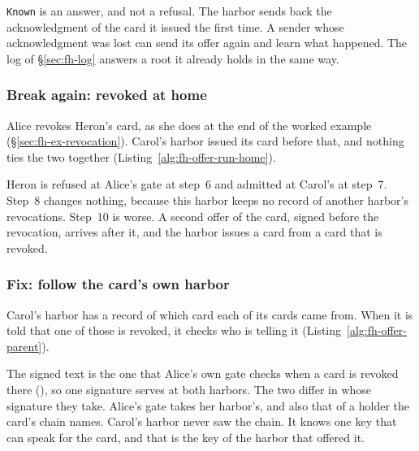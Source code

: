 
\texttt{Known} is an answer, and not a refusal. The harbor sends back the
acknowledgment of the card it issued the first time. A sender whose
acknowledgment was lost can send its offer again and learn what happened.
The log of \S\ref{sec:fh-log} answers a root it already holds in the same
way.

\subsubsection{Break again: revoked at home}

Alice revokes Heron's card, as she does at the end of the worked example
(\S\ref{sec:fh-ex-revocation}). Carol's harbor issued its card before
that, and nothing ties the two together
(Listing~\ref{alg:fh-offer-run-home}).


Heron is refused at Alice's gate at step~6 and admitted at Carol's at
step~7. Step~8 changes nothing, because this harbor keeps no record of
another harbor's revocations. Step~10 is worse. A second offer of the
card, signed before the revocation, arrives after it, and the harbor
issues a card from a card that is revoked.

\subsubsection{Fix: follow the card's own harbor}

Carol's harbor has a record of which card each of its cards came from.
When it is told that one of those is revoked, it checks who is telling it
(Listing~\ref{alg:fh-offer-parent}).


The signed text is the one that Alice's own gate checks when a card is
revoked there
(), so one
signature serves at both harbors. The two differ in whose signature they
take. Alice's gate takes her harbor's, and also that of a holder the
card's chain names. Carol's harbor never saw the chain. It knows one key
that can speak for the card, and that is the key of the harbor that
offered it.


